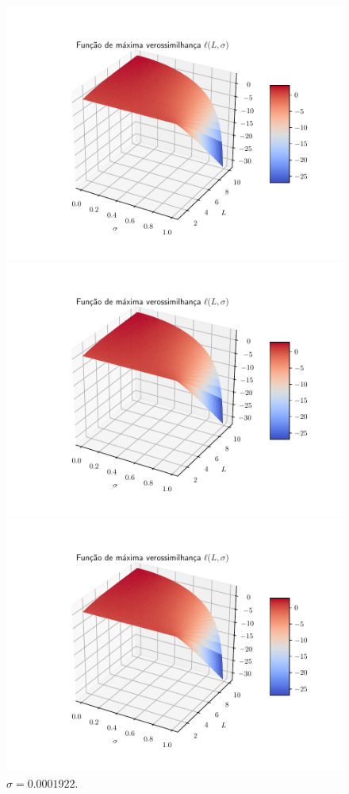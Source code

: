 \documentclass[journal,article,submit,moreauthors,pdftex]{Definitions/mdpi}
\begin{document}
\begin{figure}[hbt]
  \includegraphics[width=\linewidth]{funv_max_ver_j_50_flev_produto.pdf}
  	\caption{$\sigma= 0.0002715$.}\label{cap_acf_fig04}
\endminipage\hfill
{}
  \includegraphics[width=\linewidth]{funv_max_ver_j_60_flev_produto.pdf}
		\caption{$\sigma= 0.0001922$.}\label{cap_acf_fig05}
\endminipage\hfill
\centering
{}
  \includegraphics[width=\linewidth]{funv_max_ver_j_70_flev_produto.pdf}

\end{figure}
\end{document}
